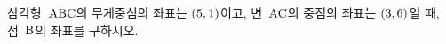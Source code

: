 삼각형~$\mathrm{ABC}$의 무게중심의 좌표는 $(5{,}\mkern3mu\mathopen{}1)$이고, 변~$\mathrm{AC}$의 중점의 좌표는 $(3{,}\mkern3mu\mathopen{}6)$일 때, 점~$\mathrm{B}$의 좌표를 구하시오.
